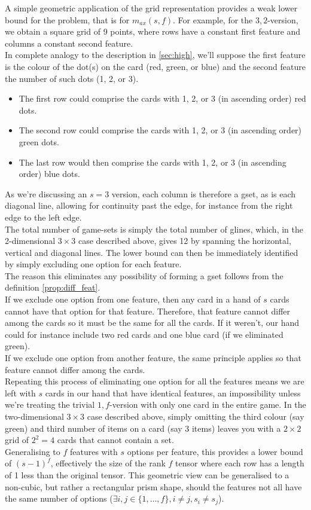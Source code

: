 \documentclass{article}
\theoremstyle{definition}
\theoremstyle{remark}
\begin{document}
A simple geometric application of the grid representation provides a weak lower bound for the problem, that is for $m_{ax}(s,f)$.
\medbreak
For example, for the $3,2$-version, we obtain a square grid of 9 points, where rows have a constant first feature and columns a constant second feature.\\
In complete analogy to the description in \autoref{sec:high}, we'll suppose the first feature is the colour of the dot(s) on the card (red, green, or blue) and the second feature the number of such dots (1, 2, or 3).
\begin{itemize}
    \item The first row could comprise the cards with 1, 2, or 3 (in ascending order) red dots.
    \item The second row could comprise the cards with 1, 2, or 3 (in ascending order) green dots.
    \item The last row would then comprise the cards with 1, 2, or 3 (in ascending order) blue dots.
\end{itemize}
As we're discussing an $s=3$ version, each column is therefore a gset, as is each diagonal line, allowing for continuity past the edge, for instance from the right edge to the left edge.\\
The total number of game-sets is simply the total number of glines, which, in the 2-dimensional $3\times3$ case described above, gives 12 by spanning the horizontal, vertical and diagonal lines.
\medbreak
The lower bound can then be immediately identified by simply excluding one option for each feature.\\
The reason this eliminates any possibility of forming a gset follows from the definition \ref{prop:diff_feat}.\\
If we exclude one option from one feature, then any card in a hand of $s$ cards cannot have that option for that feature. Therefore, that feature cannot differ among the cards so it must be the same for all the cards. If it weren't, our hand could for instance include two red cards and one blue card (if we eliminated green).\\
If we exclude one option from another feature, the same principle applies so that feature cannot differ among the cards.\\
Repeating this process of eliminating one option for all the features means we are left with $s$ cards in our hand that have identical features, an impossibility unless we're treating the trivial $1,f$-version with only one card in the entire game.
\medbreak
In the two-dimensional $3\times3$ case described above, simply omitting the third colour (say green) and third number of items on a card (say 3 items) leaves you with a $2\times2$ grid of $2^2=4$ cards that cannot contain a set.\\
Generalising to $f$ features with $s$ options per feature, this provides a lower bound of $(s-1)^f$, effectively the size of the rank $f$ tensor where each row has a length of 1 less than the original tensor.
\medbreak
This geometric view can be generalised to a non-cubic, but rather a rectangular prism shape, should the features not all have the same number of options ($\exists i,j\in\{1,\dotsc,f\},i\neq j, s_i\neq s_j$).
\end{document}
